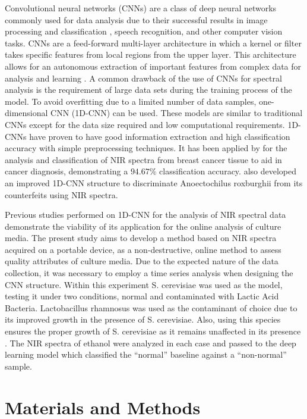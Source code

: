 \documentclass[final, 3p, 11pt]{elsarticle}
\begin{document}
Convolutional neural networks (CNNs) are a class of deep neural networks commonly used for data analysis due to their successful results in image processing and classification \citep{sharma2018cnn}, speech recognition, and other computer vision tasks. CNNs are a feed-forward multi-layer architecture in which a kernel or filter takes specific features from local regions from the upper layer. This architecture allows for an autonomous extraction of important features from complex data for analysis and learning \citep{zhangReviewMachineLearning2022}. A common drawback of the use of CNNs for spectral analysis is the requirement of large data sets during the training process of the model. To avoid overfitting due to a limited number of data samples, one-dimensional CNN (1D-CNN) can be used. These models are similar to traditional CNNs except for the data size required and low computational requirements. 1D-CNNs have proven to have good information extraction and high classification accuracy with simple preprocessing techniques. It has been applied by \citep{shangNIRSpectroscopyCombined2023} for the analysis and classification of NIR spectra from breast cancer tissue to aid in cancer diagnosis, demonstrating a $94.67\%$ classification accuracy. \citet{chaiImproved1DConvolutional2021} also developed an improved 1D-CNN structure to discriminate Anoectochilus roxburghii from its counterfeits using NIR spectra.

Previous studies performed on 1D-CNN for the analysis of NIR spectral data demonstrate the viability of its application for the online analysis of culture media. The present study aims to develop a method based on NIR spectra acquired on a portable device, as a non-destructive, online method to assess quality attributes of culture media. Due to the expected nature of the data collection, it was necessary to employ a time series analysis when designing the CNN structure. Within this experiment S. cerevisiae was used as the model, testing it under two conditions, normal and contaminated with Lactic Acid Bacteria. Lactobacillus rhamnosus was used as the contaminant of choice due to its improved growth in the presence of S. cerevisiae. Also, using this species ensures the proper growth of S. cerevisiae as it remains unaffected in its presence \citep{nenciarini2023yeast}. The NIR spectra of ethanol were analyzed in each case and passed to the deep learning model which classified the “normal” baseline against a “non-normal” sample. 

\section{Materials and Methods}
\end{document}
